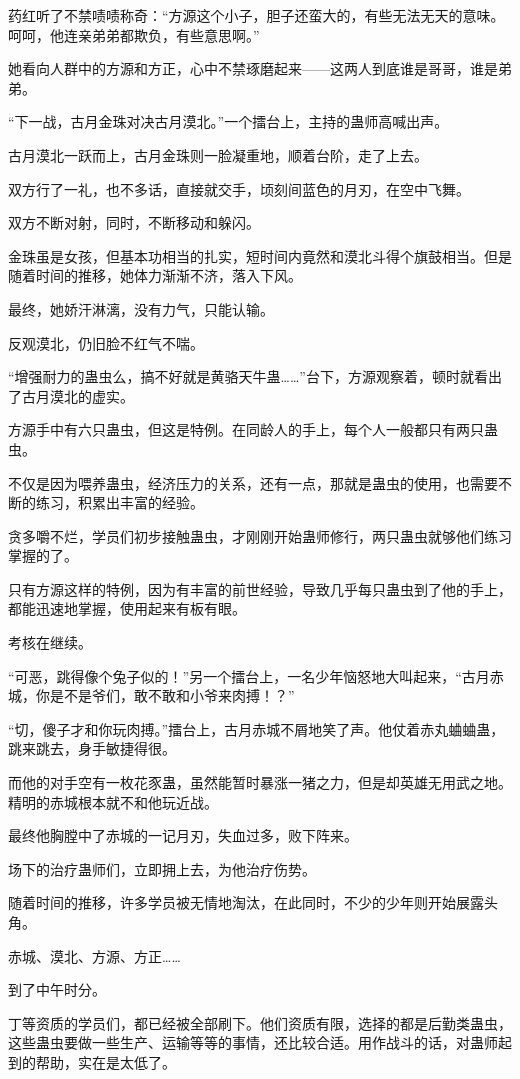 \begin{this_body}
药红听了不禁啧啧称奇：“方源这个小子，胆子还蛮大的，有些无法无天的意味。呵呵，他连亲弟弟都欺负，有些意思啊。”

她看向人群中的方源和方正，心中不禁琢磨起来——这两人到底谁是哥哥，谁是弟弟。

“下一战，古月金珠对决古月漠北。”一个擂台上，主持的蛊师高喊出声。

古月漠北一跃而上，古月金珠则一脸凝重地，顺着台阶，走了上去。

双方行了一礼，也不多话，直接就交手，顷刻间蓝色的月刃，在空中飞舞。

双方不断对射，同时，不断移动和躲闪。

金珠虽是女孩，但基本功相当的扎实，短时间内竟然和漠北斗得个旗鼓相当。但是随着时间的推移，她体力渐渐不济，落入下风。

最终，她娇汗淋漓，没有力气，只能认输。

反观漠北，仍旧脸不红气不喘。

“增强耐力的蛊虫么，搞不好就是黄骆天牛蛊……”台下，方源观察着，顿时就看出了古月漠北的虚实。

方源手中有六只蛊虫，但这是特例。在同龄人的手上，每个人一般都只有两只蛊虫。

不仅是因为喂养蛊虫，经济压力的关系，还有一点，那就是蛊虫的使用，也需要不断的练习，积累出丰富的经验。

贪多嚼不烂，学员们初步接触蛊虫，才刚刚开始蛊师修行，两只蛊虫就够他们练习掌握的了。

只有方源这样的特例，因为有丰富的前世经验，导致几乎每只蛊虫到了他的手上，都能迅速地掌握，使用起来有板有眼。

考核在继续。

“可恶，跳得像个兔子似的！”另一个擂台上，一名少年恼怒地大叫起来，“古月赤城，你是不是爷们，敢不敢和小爷来肉搏！？”

“切，傻子才和你玩肉搏。”擂台上，古月赤城不屑地笑了声。他仗着赤丸蛐蛐蛊，跳来跳去，身手敏捷得很。

而他的对手空有一枚花豕蛊，虽然能暂时暴涨一猪之力，但是却英雄无用武之地。精明的赤城根本就不和他玩近战。

最终他胸膛中了赤城的一记月刃，失血过多，败下阵来。

场下的治疗蛊师们，立即拥上去，为他治疗伤势。

随着时间的推移，许多学员被无情地淘汰，在此同时，不少的少年则开始展露头角。

赤城、漠北、方源、方正……

到了中午时分。

丁等资质的学员们，都已经被全部刷下。他们资质有限，选择的都是后勤类蛊虫，这些蛊虫要做一些生产、运输等等的事情，还比较合适。用作战斗的话，对蛊师起到的帮助，实在是太低了。


\end{this_body}
